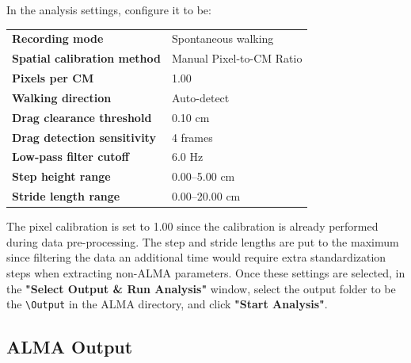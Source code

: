 \documentclass[11pt]{article}
\renewcommand{\[}{%
  \par\smallskip\noindent
  \begin{center}%
  \setlength{\fboxsep}{5pt}%
  \setlength{\fboxrule}{0.35pt}%
  \begin{lrbox}{\almaEquationBox}%
  $\displaystyle
}
\renewcommand{\]}{%
  $%
  \end{lrbox}%
  \fcolorbox{equationLine}{equationBack}{\usebox{\almaEquationBox}}%
  \end{center}%
  \smallskip\par
}
\begin{document}
In the analysis settings, configure it to be:
\begin{tcolorbox}[
    software settings,
    title=\textbf{ALMA Kinematic Analysis: Recommended Settings}
]

\begin{tabularx}{\linewidth}{KV}
\textbf{Recording mode} & Spontaneous walking \\

\textbf{Spatial calibration method} & Manual Pixel-to-CM Ratio \\

\textbf{Pixels per CM} & 1.00 \\

\textbf{Walking direction} & Auto-detect \\

\textbf{Drag clearance threshold} & 0.10 cm \\

\textbf{Drag detection sensitivity} & 4 frames \\

\textbf{Low-pass filter cutoff} & 6.0 Hz \\

\textbf{Step height range} & 0.00--5.00 cm \\

\textbf{Stride length range} & 0.00--20.00 cm \\
\end{tabularx}

\end{tcolorbox}

\noindent The pixel calibration is set to 1.00 since the calibration is already performed during data pre-processing. The step and stride lengths are put to the maximum since filtering the data an additional time would require extra standardization steps when extracting non-ALMA parameters. Once these settings are selected, in the \textbf{"Select Output \& Run Analysis"} window, select the output folder to be the \texttt{\textbackslash{}Output} in the ALMA directory, and click \textbf{"Start Analysis"}.

\subsection{ALMA Output}
\end{document}
